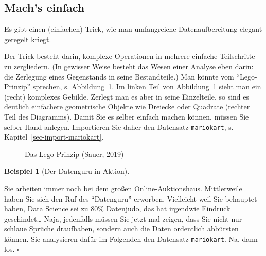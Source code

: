 \documentclass[
  letterpaper,
  oneside,
  open=any]{scrbook}
\theoremstyle{definition}
\theoremstyle{definition}
\newtheorem{example}{Beispiel}[chapter]
\theoremstyle{definition}
\theoremstyle{remark}
\begin{document}
\subsection{Mach's einfach}\label{machs-einfach}

Es gibt einen (einfachen) Trick, wie man umfangreiche Datenaufbereitung
elegant geregelt kriegt.

Der Trick besteht darin, komplexe Operationen in mehrere einfache
Teilschritte zu zergliedern. (In gewisser Weise besteht das Wesen einer
Analyse eben darin: die Zerlegung eines Gegenstands in seine
Bestandteile.) Man könnte vom \enquote{Lego-Prinzip} sprechen, s.
Abbildung~\ref{fig-lego}. Im linken Teil von Abbildung~\ref{fig-lego}
sieht man ein (recht) komplexes Gebilde. Zerlegt man es aber in seine
Einzelteile, so sind es deutlich einfachere geometrische Objekte wie
Dreiecke oder Quadrate (rechter Teil des Diagramms). Damit Sie es selber
einfach machen können, müssen Sie selber Hand anlegen. Importieren Sie
daher den Datensatz \texttt{mariokart}, s.
Kapitel~\ref{sec-import-mariokart}.

\begin{figure}


\caption{\label{fig-lego}Das Lego-Prinzip (Sauer, 2019)}

\end{figure}%

\begin{example}[Der Datenguru in
Aktion]\protect\hypertarget{exm-datenjudo}{}\label{exm-datenjudo}

Sie arbeiten immer noch bei dem großen Online-Auktionshaus. Mittlerweile
haben Sie sich den Ruf des \enquote{Datenguru} erworben. Vielleicht weil
Sie behauptet haben, Data Science sei zu 80\% Datenjudo, das hat
irgendwie Eindruck geschindet\ldots{} Naja, jedenfalls müssen Sie jetzt
mal zeigen, dass Sie nicht nur schlaue Sprüche draufhaben, sondern auch
die Daten ordentlich abbürsten können. Sie analysieren dafür im
Folgenden den Datensatz \texttt{mariokart}. Na, dann los. \(\square\)

\end{example}
\end{document}
